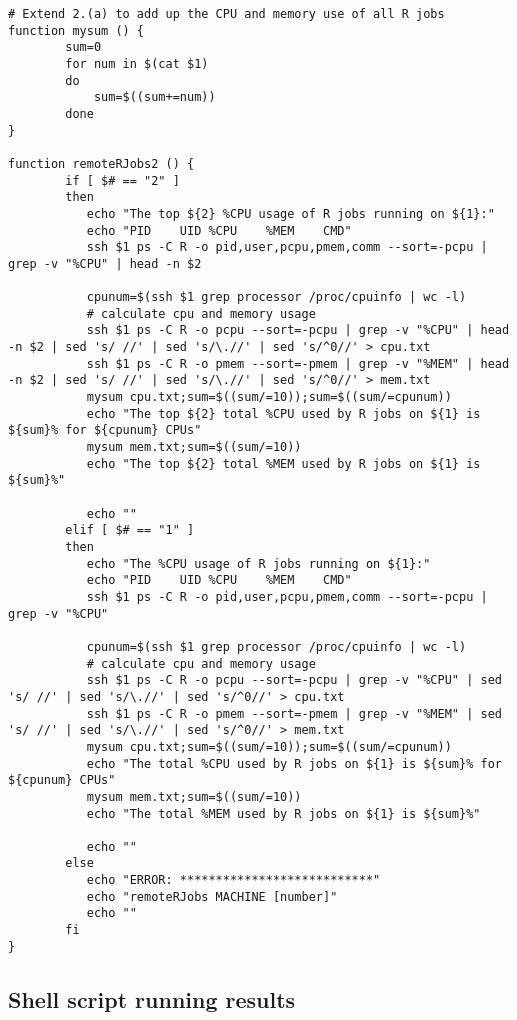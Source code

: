 \documentclass{article}
\begin{document}
\begin{lstlisting}
# Extend 2.(a) to add up the CPU and memory use of all R jobs
function mysum () {
		sum=0
		for num in $(cat $1)
		do
		    sum=$((sum+=num))
		done
}

function remoteRJobs2 () {
		if [ $# == "2" ]
		then 
		   echo "The top ${2} %CPU usage of R jobs running on ${1}:" 
		   echo "PID	UID	%CPU	%MEM	CMD"
		   ssh $1 ps -C R -o pid,user,pcpu,pmem,comm --sort=-pcpu | grep -v "%CPU" | head -n $2
		   
		   cpunum=$(ssh $1 grep processor /proc/cpuinfo | wc -l)
		   # calculate cpu and memory usage
		   ssh $1 ps -C R -o pcpu --sort=-pcpu | grep -v "%CPU" | head -n $2 | sed 's/ //' | sed 's/\.//' | sed 's/^0//' > cpu.txt
		   ssh $1 ps -C R -o pmem --sort=-pmem | grep -v "%MEM" | head -n $2 | sed 's/ //' | sed 's/\.//' | sed 's/^0//' > mem.txt
		   mysum cpu.txt;sum=$((sum/=10));sum=$((sum/=cpunum))
		   echo "The top ${2} total %CPU used by R jobs on ${1} is ${sum}% for ${cpunum} CPUs"
		   mysum mem.txt;sum=$((sum/=10))
		   echo "The top ${2} total %MEM used by R jobs on ${1} is ${sum}%"
		   
		   echo ""
		elif [ $# == "1" ]
		then 
		   echo "The %CPU usage of R jobs running on ${1}:" 
		   echo "PID	UID	%CPU	%MEM	CMD"
		   ssh $1 ps -C R -o pid,user,pcpu,pmem,comm --sort=-pcpu | grep -v "%CPU"
		   
		   cpunum=$(ssh $1 grep processor /proc/cpuinfo | wc -l)
		   # calculate cpu and memory usage
		   ssh $1 ps -C R -o pcpu --sort=-pcpu | grep -v "%CPU" | sed 's/ //' | sed 's/\.//' | sed 's/^0//' > cpu.txt
		   ssh $1 ps -C R -o pmem --sort=-pmem | grep -v "%MEM" | sed 's/ //' | sed 's/\.//' | sed 's/^0//' > mem.txt
		   mysum cpu.txt;sum=$((sum/=10));sum=$((sum/=cpunum))
		   echo "The total %CPU used by R jobs on ${1} is ${sum}% for ${cpunum} CPUs"
		   mysum mem.txt;sum=$((sum/=10))
		   echo "The total %MEM used by R jobs on ${1} is ${sum}%"
		   
		   echo ""
		else
		   echo "ERROR: ***************************"
		   echo "remoteRJobs MACHINE [number]"
		   echo ""
		fi 
}
\end{lstlisting}

\subsection*{Shell script running results}




\newpage
\end{document}
